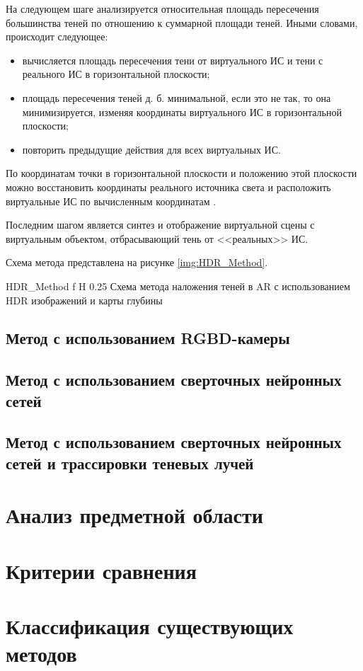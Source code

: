 На следующем шаге анализируется относительная площадь пересечения большинства теней по отношению к суммарной площади теней. Иными словами, происходит следующее:

\begin{itemize}
	\item вычисляется площадь пересечения тени от виртуального ИС и тени с реального ИС в горизонтальной плоскости;
	\item площадь пересечения теней д. б. минимальной, если это не так, то она минимизируется, изменяя координаты виртуального ИС в горизонтальной плоскости;
	\item повторить предыдущие действия для всех виртуальных ИС.
\end{itemize}

По координатам точки в горизонтальной плоскости и положению этой плоскости можно восстановить координаты реального источника света и расположить виртуальные ИС по вычисленным координатам \cite{hdr_method}.

Последним шагом является синтез и отображение виртуальной сцены с виртуальным объектом, отбрасывающий тень от <<реальных>> ИС.

Схема метода представлена на рисунке \ref{img:HDR_Method}.

	{HDR_Method}
	{f}
	{H}
	{0.25\textwidth}
	{Схема метода наложения теней в AR с использованием HDR изображений и карты глубины}

\subsection{Метод с использованием RGBD-камеры}

\subsection{Метод с использованием сверточных нейронных сетей}

\subsection{Метод с использованием сверточных нейронных сетей и трассировки теневых лучей}

\section{Анализ предметной области}



\section{Критерии сравнения}



\section{Классификация существующих методов}


